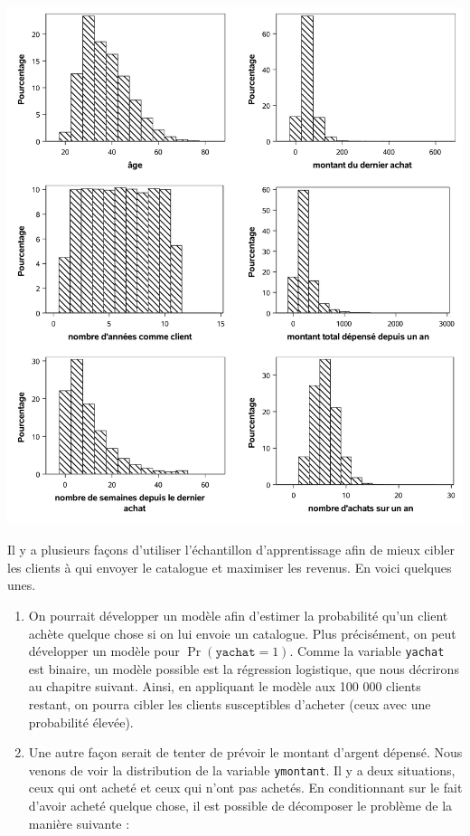 \documentclass[
  11pt,
  letterpaper,
]{book}
\providecommand{\tightlist}{%
  \setlength{\itemsep}{0pt}\setlength{\parskip}{0pt}}
\theoremstyle{definition}
\theoremstyle{definition}
\theoremstyle{definition}
\theoremstyle{remark}
\begin{document}
\begin{center}\includegraphics[width=0.9\linewidth]{figures/02-select-e6} \end{center}

Il y a plusieurs façons d'utiliser l'échantillon d'apprentissage afin de mieux cibler les clients à qui envoyer le catalogue et maximiser les revenus. En voici quelques unes.

\begin{enumerate}
\def\labelenumi{\alph{enumi})}
\tightlist
\item
  On pourrait développer un modèle afin d'estimer la probabilité qu'un client achète quelque chose si on lui envoie un catalogue. Plus précisément, on peut développer un modèle pour \(\Pr(\texttt{yachat}=1)\). Comme la variable \texttt{yachat} est binaire, un modèle possible est la régression logistique, que nous décrirons au chapitre suivant. Ainsi, en appliquant le modèle aux 100 000 clients restant, on pourra cibler les clients susceptibles d'acheter (ceux avec une probabilité élevée).
\item
  Une autre façon serait de tenter de prévoir le montant d'argent dépensé. Nous venons de voir la distribution de la variable \texttt{ymontant}. Il y a deux situations, ceux qui ont acheté et ceux qui n'ont pas achetés. En conditionnant sur le fait d'avoir acheté quelque chose, il est possible de décomposer le problème de la manière suivante :
\end{enumerate}
\end{document}
